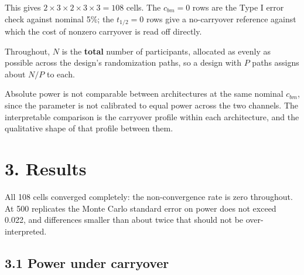 \documentclass[
  11pt,
]{article}
\begin{document}
This gives \(2 \times 3 \times 2 \times 3 \times 3 = 108\) cells. The
\(c_{bm} = 0\) rows are the Type I error check against nominal 5\%; the
\(t_{1/2} = 0\) rows give a no-carryover reference against which the
cost of nonzero carryover is read off directly.

Throughout, \(N\) is the \textbf{total} number of participants,
allocated as evenly as possible across the design's randomization
paths, so a design with \(P\) paths assigns about \(N/P\) to each.

Absolute power is not comparable between architectures at the same
nominal \(c_{bm}\), since the parameter is not calibrated to equal
power across the two channels. The interpretable comparison is the
carryover profile within each architecture, and the qualitative shape
of that profile between them.

\section{3. Results}

All 108 cells converged completely: the non-convergence rate is zero
throughout. At 500 replicates the Monte Carlo standard error on
power does not exceed 0.022,
and differences smaller than about twice that should not be
over-interpreted.

\subsection{3.1 Power under carryover}

\begin{table}
\centering
\caption{\label{tab:tab-main}Power by architecture, trial design and carryover
    half-life at $c_{bm} = 0.30$, $N = 70$, 500 replicates per cell.
    Cost is the power lost in moving from no carryover to a one-week
    half-life. Absolute power is not comparable between architectures
    at a common nominal $c_{bm}$; the interpretable quantity is the
    profile across half-life within each architecture.}
\centering
{}
\end{table}
\end{document}
